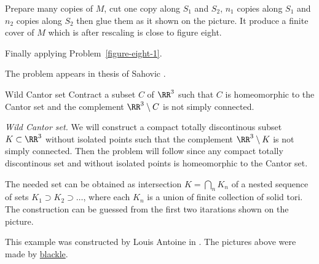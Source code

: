 Prepare many copies of $M$, cut one copy along $S_1$ and $S_2$,
$n_1$ copies along $S_1$ and $n_2$ copies along $S_2$
then glue them as it shown on the picture. 
It produce a finite cover of $M$ which is after rescaling is close to figure eight.

Finally applying Problem~\ref{figure-eight-1}.

 The problem appears in thesis of Sahovic \cite{sahovic}.



















\begin{pr}{}{Wild Cantor set}\label{Wild Cantor set} 
Contract a subset $C$ of $\RR^3$ 
such that $C$ is homeomorphic to the Cantor set and the complement $\RR^3\setminus C$ is not simply connected.
\end{pr}



\textit{Wild Cantor set.}
We will construct a compact totally discontinous subset $K\subset\RR^3$ without isolated points  
such that the complement $\RR^3\setminus K$ is not simply connected.
Then the problem will follow
since any compact totally discontinous set and without isolated points
is homeomorphic to the Cantor set.

The needed set can be obtained as intersection $K=\bigcap_n K_n$
of a nested sequence 
of sets $K_1\supset K_2\supset\dots$, where each $K_n$ is a union of finite collection of solid tori. 
The construction can be guessed from the first two itarations shown on the picture.

This example was constructed by Louis Antoine in \cite{antoine}.
The pictures above were made by \href{http://en.wikipedia.org/wiki/User:Blacklemon67}{blackle}.


























